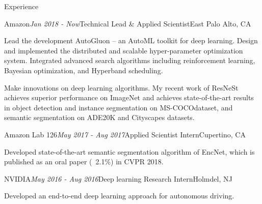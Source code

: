\documentclass{resume} %
\begin{document}
\begin{rSection}{Experience}

\begin{rSubsection}{Amazon}{\em Jan 2018 - Now}{Technical Lead \& Applied Scientist}{East Palo Alto, CA} %
\item Lead the development AutoGluon -- an AutoML toolkit for deep learning. Design and implemented the distributed and scalable hyper-parameter optimization system. Integrated advanced search algorithms including reinforcement learning, Bayesian optimization, and Hyperband scheduling.
\item Make innovations on deep learning algorithms. My recent work of ResNeSt achieves superior performance on ImageNet and achieves state-of-the-art results in object detection and instance segmentation on MS-COCOdataset, and semantic segmentation on ADE20K and Cityscapes datasets.
\end{rSubsection}


\begin{rSubsection}{Amazon Lab 126}{\em May 2017 - Aug 2017}{Applied Scientist Intern}{Cupertino, CA}
\item Developed state-of-the-art semantic segmentation algorithm of EncNet, which is published as an oral paper (~2.1\%) in CVPR 2018. 
\end{rSubsection}

\begin{rSubsection}{NVIDIA}{\em May 2016 - Aug 2016}{Deep learning Research Intern}{Holmdel, NJ}
\item Developed an end-to-end deep learning approach for autonomous driving. 
\end{rSubsection}


\end{rSection}
\end{document}
